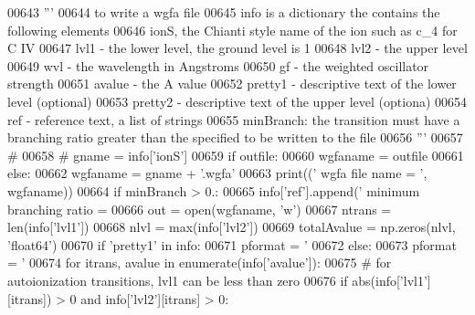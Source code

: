 \begin{DoxyCode}
{{{{{{{{{00643     \textcolor{stringliteral}{'''}
00644 \textcolor{stringliteral}{    to write a wgfa file}
00645 \textcolor{stringliteral}{    info is a dictionary the contains the following elements}
00646 \textcolor{stringliteral}{    ionS, the Chianti style name of the ion such as c\_4 for C IV}
00647 \textcolor{stringliteral}{    lvl1 - the lower level, the ground level is 1}
00648 \textcolor{stringliteral}{    lvl2 - the upper level}
00649 \textcolor{stringliteral}{    wvl - the wavelength in Angstroms}
00650 \textcolor{stringliteral}{    gf - the weighted oscillator strength}
00651 \textcolor{stringliteral}{    avalue - the A value}
00652 \textcolor{stringliteral}{    pretty1 - descriptive text of the lower level (optional)}
00653 \textcolor{stringliteral}{    pretty2 - descriptive text of the upper level (optiona)}
00654 \textcolor{stringliteral}{    ref - reference text, a list of strings}
00655 \textcolor{stringliteral}{    minBranch:  the transition must have a branching ratio greater than the specified to be written to the
       file}
00656 \textcolor{stringliteral}{    '''}
00657     \textcolor{comment}{#}
00658 \textcolor{comment}{#    gname = info['ionS']}
00659     \textcolor{keywordflow}{if} outfile:
00660         wgfaname = outfile
00661     \textcolor{keywordflow}{else}:
00662         wgfaname = gname + \textcolor{stringliteral}{'.wgfa'}
00663     print((\textcolor{stringliteral}{' wgfa file name = '}, wgfaname))
00664     \textcolor{keywordflow}{if} minBranch > 0.:
00665         info[\textcolor{stringliteral}{'ref'}].append(\textcolor{stringliteral}{' minimum branching ratio = %
00666     out = open(wgfaname, \textcolor{stringliteral}{'w'})
00667     ntrans = len(info[\textcolor{stringliteral}{'lvl1'}])
00668     nlvl = max(info[\textcolor{stringliteral}{'lvl2'}])
00669     totalAvalue = np.zeros(nlvl, \textcolor{stringliteral}{'float64'})
00670     \textcolor{keywordflow}{if} \textcolor{stringliteral}{'pretty1'} \textcolor{keywordflow}{in} info:
00671         pformat = \textcolor{stringliteral}{'%
00672     \textcolor{keywordflow}{else}:
00673         pformat = \textcolor{stringliteral}{'%
00674     \textcolor{keywordflow}{for} itrans, avalue \textcolor{keywordflow}{in} enumerate(info[\textcolor{stringliteral}{'avalue'}]):
00675         \textcolor{comment}{# for autoionization transitions, lvl1 can be less than zero}
00676         \textcolor{keywordflow}{if} abs(info[\textcolor{stringliteral}{'lvl1'}][itrans]) > 0 \textcolor{keywordflow}{and} info[\textcolor{stringliteral}{'lvl2'}][itrans] > 0:
}}}}}}}}}}}}
\end{DoxyCode}
